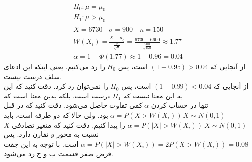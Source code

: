 \\
\begin{gather*}
    H_0: \mu = \mu_0\\
    H_1: \mu > \mu_0\\
    \overline{X} = 6730 \quad \sigma = 900 \quad n = 150\\
    W(X_i) = \frac{\overline{X}-\mu_0}{\frac{\sigma}{\sqrt{n}}} = \frac{6730 - 6600}{\frac{900}{\sqrt{150}}} \approx 1.77\\
    \alpha = 1 - \Phi(1.77) \approx 1 - 0.96 = 0.04
\end{gather*}
از آنجایی که
$(1 - 0.95) > 0.04$
است، پس
$H_0$
را رد می‌کنیم. یعنی اینکه این ادعای سلف درست نیست.
\\
از آنجایی که
$(1 - 0.99) < 0.04$
است، پس
$H_0$
را نمی‌توان رد کرد. دقت کنید که این به این معنا نیست که
$H_1$
درست است. بلکه بدین معنا است که 
\\
تنها در حساب کردن
$\alpha$
کمی تفاوت حاصل می‌شود. دقت کنید که در قبل
$\alpha = P(X > W(X_i)) ~ X \sim N(0, 1)$
بود. ولی حالا که دو طرفه است، باید
$\alpha = P(|X| > W(X_i)) ~ X \sim N(0, 1)$
را پیدا کنیم. دقت کنید که متغیر تصادفی
$X$
نسبت به محور
$y$
تقارن دارد. پس 
$\alpha = P(|X| > W(X_i)) = 2P(X > W(X_i)) = 0.08$
است. با توجه به این
جفت فرض صفر قسمت ب و ج رد می‌شود.




